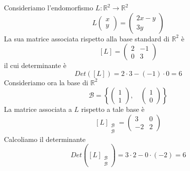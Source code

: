 \begin{example}
	Consideriamo l'endomorfismo $L : \mathbb{R}^2 \to \mathbb{R}^2$
	\[
		L \begin{pmatrix}
			x \\ y
		\end{pmatrix} =
		\begin{pmatrix}
			2x - y \\
			3y
		\end{pmatrix}
	\]
	La sua matrice associata rispetto alla base standard di $\mathbb{R}^2$ \`e
	\[
		[L] = \begin{pmatrix}
			2 & -1 \\
			0 & 3
		\end{pmatrix}
	\]
	il cui determinante \`e \[ Det([L]) = 2 \cdot 3 - (-1) \cdot 0 = 6 \]
	Consideriamo ora la base di $\mathbb{R}^2$
	\[
		\mathcal{B} =
		\left\{
		\begin{pmatrix} 1 \\ 1 \end{pmatrix}, \quad
		\begin{pmatrix} 1 \\ 0 \end{pmatrix}
		\right\}
	\]
	La matrice associata a $L$ rispetto a tale base \`e
	\[
		[L]_{\substack{\mathcal{B} \\ \mathcal{B}}} =
		\begin{pmatrix}
			3  & 0 \\
			-2 & 2
		\end{pmatrix}
	\]
	Calcoliamo il determinante
	\[
		Det \left( [L]_{\substack{\mathcal{B} \\ \mathcal{B}}} \right) =
		3 \cdot 2 - 0 \cdot (-2) = 6
	\]
\end{example}